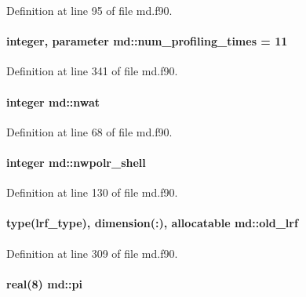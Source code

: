 Definition at line 95 of file md.\-f90.

\hypertarget{classmd_adf6e8f816b1ca69f936610d6774297b0}{
\paragraph[{num\-\_\-profiling\-\_\-times}]{\setlength{\rightskip}{0pt plus 5cm}integer, parameter md\-::num\-\_\-profiling\-\_\-times = 11}}\label{classmd_adf6e8f816b1ca69f936610d6774297b0}


Definition at line 341 of file md.\-f90.

\hypertarget{classmd_a9cd59ec25aea40b601f42e0e80b23944}{
\paragraph[{nwat}]{\setlength{\rightskip}{0pt plus 5cm}integer md\-::nwat}}\label{classmd_a9cd59ec25aea40b601f42e0e80b23944}


Definition at line 68 of file md.\-f90.

\hypertarget{classmd_a41255490154352513bb18e9b612f8866}{
\paragraph[{nwpolr\-\_\-shell}]{\setlength{\rightskip}{0pt plus 5cm}integer md\-::nwpolr\-\_\-shell}}\label{classmd_a41255490154352513bb18e9b612f8866}


Definition at line 130 of file md.\-f90.

\hypertarget{classmd_a721ce8c8d5a907169c25db6076cbae89}{
\paragraph[{old\-\_\-lrf}]{\setlength{\rightskip}{0pt plus 5cm}type({\bf lrf\-\_\-type}), dimension(\-:), allocatable md\-::old\-\_\-lrf}}\label{classmd_a721ce8c8d5a907169c25db6076cbae89}


Definition at line 309 of file md.\-f90.

\hypertarget{classmd_a1e7c5d22c5511259671696e33773e711}{
\paragraph[{pi}]{\setlength{\rightskip}{0pt plus 5cm}real(8) md\-::pi}}\label{classmd_a1e7c5d22c5511259671696e33773e711}


